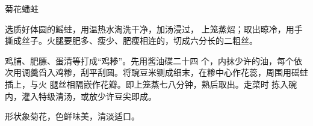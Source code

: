 \begin{recipe}{菊花蟠蛀}

\ingredients


\cooking

\step 选质好体圆的鳐蛀，用温热水淘洗干净，加汤浸过，
上笼蒸炤；取出晾冷，用手撕成丝子。火腿要肥多、瘦少、肥痩相连的，切成六分长的二粗丝。

\step 鸡脯、肥膘、蛋清等打成“鸡糁”。先用酱油碟二十四
个，内抹少许的油，每个依次用调羹舀入鸡糁，刮平刮圆。将豌豆米铡成细末，在糁中心作花蕊，周围用磘蛀插上，与火 腿丝相隔嵌作花瓣。即上笼蒸七八分钟，熟后取出。走菜时 拣入碗内，灌入特级清汤，或放少许豆尖即成。

\notes

形状象菊花，色鲜味美，清淡适口。

\end{recipe}

